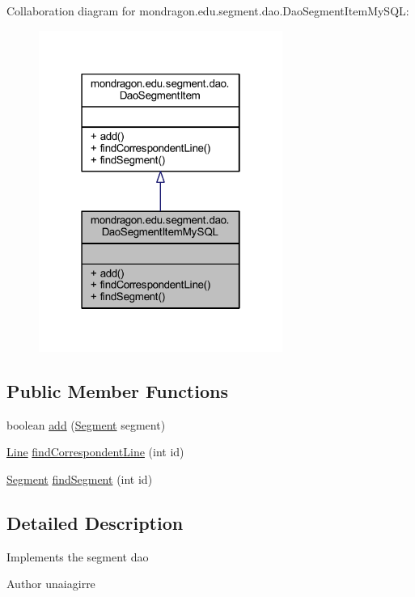 Collaboration diagram for mondragon.\+edu.\+segment.\+dao.\+Dao\+Segment\+Item\+My\+S\+QL\+:\nopagebreak
\begin{figure}[H]
\begin{center}
\leavevmode
\includegraphics[width=226pt]{classmondragon_1_1edu_1_1segment_1_1dao_1_1_dao_segment_item_my_s_q_l__coll__graph}
\end{center}
\end{figure}
\subsection*{Public Member Functions}
\begin{DoxyCompactItemize}
\item 
boolean \mbox{\hyperlink{classmondragon_1_1edu_1_1segment_1_1dao_1_1_dao_segment_item_my_s_q_l_a8a602c05b2ff07c8b27a3e90214fb761}{add}} (\mbox{\hyperlink{classmondragon_1_1edu_1_1clases_1_1_segment}{Segment}} segment)
\item 
\mbox{\hyperlink{classmondragon_1_1edu_1_1clases_1_1_line}{Line}} \mbox{\hyperlink{classmondragon_1_1edu_1_1segment_1_1dao_1_1_dao_segment_item_my_s_q_l_a0ee35d6b3aa569e60f8e9dd8714341d7}{find\+Correspondent\+Line}} (int id)
\item 
\mbox{\hyperlink{classmondragon_1_1edu_1_1clases_1_1_segment}{Segment}} \mbox{\hyperlink{classmondragon_1_1edu_1_1segment_1_1dao_1_1_dao_segment_item_my_s_q_l_aa3f1cdd2a4bee4fe9bf0da57adfa949f}{find\+Segment}} (int id)
\end{DoxyCompactItemize}


\subsection{Detailed Description}
Implements the segment dao \begin{DoxyAuthor}{Author}
unaiagirre 
\end{DoxyAuthor}


